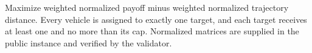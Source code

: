 Maximize weighted normalized payoff minus weighted normalized trajectory distance. Every vehicle is assigned to exactly one target, and each target receives at least one and no more than its cap. Normalized matrices are supplied in the public instance and verified by the validator.
